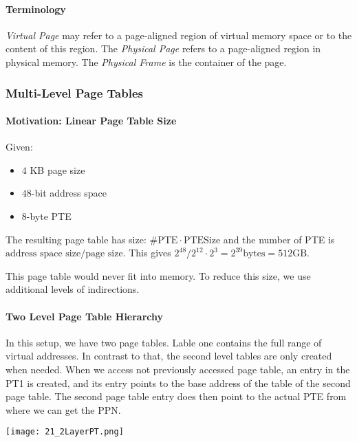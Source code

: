 

\paragraph{Terminology}
\textit{Virtual Page} may refer to a page-aligned region of virtual memory space or to the content of this region. The \textit{Physical Page} refers to a page-aligned region in physical memory. The \textit{Physical Frame} is the container of the page.

\subsubsection{Multi-Level Page Tables}

\paragraph{Motivation: Linear Page Table Size}
Given:
\begin{itemize}
    \item $4$ KB page size
    \item $48$-bit address space
    \item $8$-byte PTE
\end{itemize}

The resulting page table has size: $\#\text{PTE} \cdot \text{PTESize}$ and the number of PTE is $\text{address space size} / \text{page size}$. This gives $2^{48} / 2^{12} \cdot 2^3 = 2^{39} \text{bytes} = 512 \text{GB}$.

This page table would never fit into memory. To reduce this size, we use additional levels of indirections.

\paragraph{Two Level Page Table Hierarchy}
In this setup, we have two page tables. Lable one contains the full range of virtual addresses. In contrast to that, the second level tables are only created when needed. When we access not previously accessed page table, an entry in the PT1 is created, and its entry points to the base address of the table of the second page table. The second page table entry does then point to the actual PTE from where we can get the PPN.

\texttt{[image: 21\_2LayerPT.png]}

